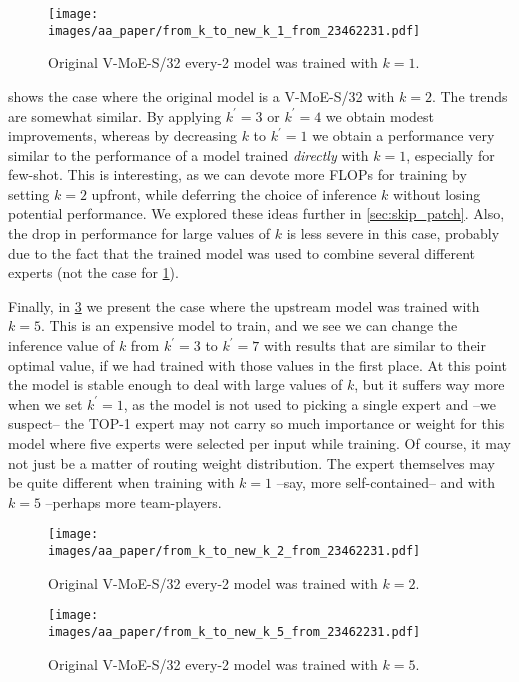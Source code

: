 \documentclass{article}
\newcommand{\abbv}{{V-MoE}}
\begin{document}
\begin{figure}[h]
\centering
\texttt{[image: images/aa\_paper/from\_k\_to\_new\_k\_1\_from\_23462231.pdf]}
\caption{Original V-MoE-S/32 every-2 model was trained with $k=1$.}
\label{im:from_k_to_new_k_1_full}
\end{figure}

 shows the case where the original model is a \abbv{}-S/32 with $k=2$.
The trends are somewhat similar.
By applying $k^\prime=3$ or $k^\prime=4$ we obtain modest improvements, whereas by decreasing $k$ to $k^\prime=1$ we obtain a performance very similar to the performance of a model trained \emph{directly} with $k=1$, especially for few-shot.
This is interesting, as we can devote more FLOPs for training by setting $k=2$ upfront, while deferring the choice of inference $k$ without losing potential performance.
We explored these ideas further in \cref{sec:skip_patch}.
Also, the drop in performance for large values of $k$ is less severe in this case, probably due to the fact that the trained model was used to combine several different experts (not the case for \cref{im:from_k_to_new_k_1_full}).

Finally, in \cref{im:from_k_to_new_k_5_full} we present the case where the upstream model was trained with $k=5$.
This is an expensive model to train, and we see we can change the inference value of $k$ from $k^\prime = 3$ to $k^\prime = 7$ with results that are similar to their optimal value, if we had trained with those values in the first place. At this point the model is stable enough to deal with large values of $k$, but it suffers way more when we set $k^\prime = 1$, as the model is not used to picking a single expert and --we suspect-- the TOP-1 expert may not carry so much importance or weight for this model where five experts were selected per input while training.
Of course, it may not just be a matter of routing weight distribution.
The expert themselves may be quite different when training with $k=1$ --say, more self-contained-- and with $k=5$ --perhaps more team-players.

\begin{figure}[h]
\centering
\texttt{[image: images/aa\_paper/from\_k\_to\_new\_k\_2\_from\_23462231.pdf]}
\caption{Original V-MoE-S/32 every-2 model was trained with $k=2$.}
\label{im:from_k_to_new_k_2_full}
\end{figure}

\begin{figure}[h]
\centering
\texttt{[image: images/aa\_paper/from\_k\_to\_new\_k\_5\_from\_23462231.pdf]}
\caption{Original V-MoE-S/32 every-2 model was trained with $k=5$.}
\label{im:from_k_to_new_k_5_full}
\end{figure}
 
\end{document}
